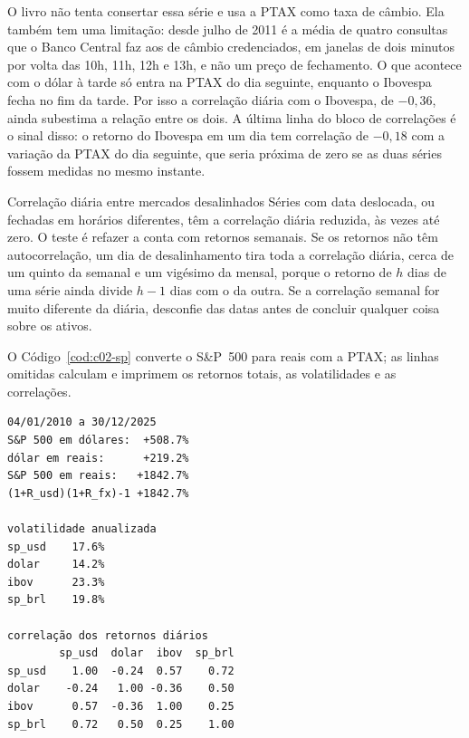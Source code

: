 O livro não tenta consertar essa série e usa a PTAX como taxa de câmbio. Ela também tem uma limitação: desde julho de 2011 é a média de quatro consultas que o Banco Central faz aos  de câmbio credenciados, em janelas de dois minutos por volta das 10h, 11h, 12h e 13h, e não um preço de fechamento. O que acontece com o dólar à tarde só entra na PTAX do dia seguinte, enquanto o Ibovespa fecha no fim da tarde. Por isso a correlação diária com o Ibovespa, de $-0,36$, ainda subestima a relação entre os dois. A última linha do bloco de correlações é o sinal disso: o retorno do Ibovespa em um dia tem correlação de $-0,18$ com a variação da PTAX do dia seguinte, que seria próxima de zero se as duas séries fossem medidas no mesmo instante.

\begin{armadilha}{Correlação diária entre mercados desalinhados}
Séries com data deslocada, ou fechadas em horários diferentes, têm a correlação diária reduzida, às vezes até zero. O teste é refazer a conta com retornos semanais. Se os retornos não têm autocorrelação, um dia de desalinhamento tira toda a correlação diária, cerca de um quinto da semanal e um vigésimo da mensal, porque o retorno de $h$ dias de uma série ainda divide $h - 1$ dias com o da outra. Se a correlação semanal for muito diferente da diária, desconfie das datas antes de concluir qualquer coisa sobre os ativos.
\end{armadilha}

O Código~\ref{cod:c02-sp} converte o S\&P~500 para reais com a PTAX; as linhas omitidas calculam e imprimem os retornos totais, as volatilidades e as correlações.


\begin{lstlisting}[style=saida]
04/01/2010 a 30/12/2025
S&P 500 em dólares:  +508.7%
dólar em reais:      +219.2%
S&P 500 em reais:   +1842.7%
(1+R_usd)(1+R_fx)-1 +1842.7%

volatilidade anualizada
sp_usd    17.6%
dolar     14.2%
ibov      23.3%
sp_brl    19.8%

correlação dos retornos diários
        sp_usd  dolar  ibov  sp_brl
sp_usd    1.00  -0.24  0.57    0.72
dolar    -0.24   1.00 -0.36    0.50
ibov      0.57  -0.36  1.00    0.25
sp_brl    0.72   0.50  0.25    1.00
\end{lstlisting}


